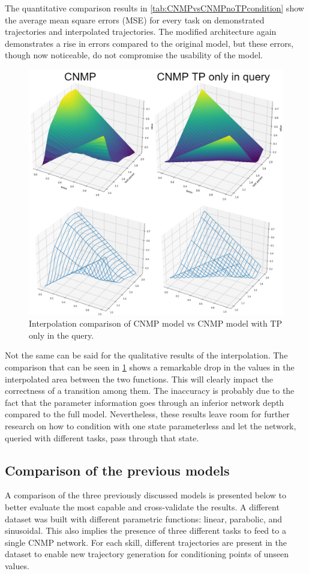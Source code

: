 The quantitative comparison results in \cref{tab:CNMPvsCNMPnoTPcondition} show the average mean square errors (MSE) for every task on demonstrated trajectories and interpolated trajectories. The modified architecture again demonstrates a rise in errors compared to the original model, but these errors, though now noticeable, do not compromise the usability of the model.
\begin{figure}
    \centering
    \includegraphics[width=0.8\linewidth]{figures/comparisonCNMPvsCNMPonlyTPquery.png}
    \caption{ Interpolation comparison of CNMP model vs CNMP model with TP only in the query. }
    \label{fig:comparisonCNMPvsCNMPonlyTPquery}
\end{figure}
Not the same can be said for the qualitative results of the interpolation. The comparison that can be seen in \cref{fig:comparisonCNMPvsCNMPonlyTPquery} shows a remarkable drop in the values in the interpolated area between the two functions. This will clearly impact the correctness of a transition among them. The inaccuracy is probably due to the fact that the parameter information goes through an inferior network depth compared to the full model.  
Nevertheless, these results leave room for further research on how to condition with one state parameterless and let the network, queried with different tasks, pass through that state.




\subsection{Comparison of the previous models}
A comparison of the three previously discussed models is presented below to better evaluate the most capable and cross-validate the results. 
A different dataset was built with different parametric functions: linear, parabolic, and sinusoidal. This also implies the presence of three different tasks to feed to a single CNMP network. For each skill, different trajectories are present in the dataset to enable new trajectory generation for conditioning points of unseen values. 

